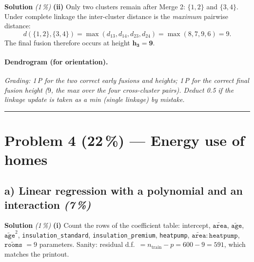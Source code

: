 \documentclass[11pt,a4paper]{article}
\newcommand{\points}[1]{\textbf{(#1\,\%)}}
\newcommand{\subpoints}[1]{\textit{(#1\,\%)}}
\newcommand{\sol}{\noindent\textbf{Solution}}
\begin{document}
\medskip
\sol{} \subpoints{1} \textbf{(ii)} Only two clusters remain after Merge 2: $\{1,2\}$ and $\{3,4\}$.
Under complete linkage the inter-cluster distance is the \emph{maximum} pairwise distance:
$$d(\{1,2\},\{3,4\}) = \max(d_{13}, d_{14}, d_{23}, d_{24}) = \max(8,7,9,6) = \boxed{9}.$$
The final fusion therefore occurs at height $\mathbf{h_3 = 9}$.

\paragraph{Dendrogram (for orientation).}
\begin{center}
\end{center}

\noindent\emph{Grading: 1\,P for the two correct early fusions and heights; 1\,P for the correct
final fusion height ($9$, the max over the four cross-cluster pairs). Deduct 0.5 if the linkage
update is taken as a min (single linkage) by mistake.}

\vspace{0.6em}
\hrule
\vspace{1em}

\section*{Problem 4 \points{22} --- Energy use of homes}

\subsection*{a) Linear regression with a polynomial and an interaction \subpoints{7}}

\sol{} \subpoints{1} \textbf{(i)} Count the rows of the coefficient table:
intercept, $\widetilde{\texttt{area}}$, $\widetilde{\texttt{age}}$, $\widetilde{\texttt{age}}^2$,
\texttt{insulation\_standard}, \texttt{insulation\_premium}, \texttt{heatpump},
$\widetilde{\texttt{area}}{:}\texttt{heatpump}$, $\widetilde{\texttt{rooms}}$ $= \boxed{9}$
parameters. Sanity: residual d.f.\ $= n_{\text{train}} - p = 600 - 9 = 591$, which matches the
printout. \checkmark
\end{document}
